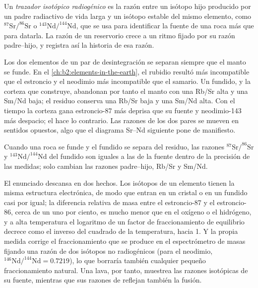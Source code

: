\begin{definition}\label{def:b2:isotope-geochemistry:tracer}
Un \emph{trazador isotópico radiogénico} es la razón
entre un isótopo hijo producido por un padre radiactivo de vida larga y un isótopo
estable del mismo elemento, como $^{87}\mathrm{Sr}/^{86}\mathrm{Sr}$ o
$^{143}\mathrm{Nd}/^{144}\mathrm{Nd}$, que se usa para identificar la fuente de una roca más que
para datarla. La razón de un reservorio crece a un ritmo fijado por su
razón padre--hijo, y registra así la historia de esa razón.
\end{definition}

Los dos elementos de un par de desintegración se separan siempre que el manto se funde. En el
\cref{ch:b2:elements-in-the-earth}, el rubidio resultó más incompatible que el
estroncio y el neodimio más incompatible que el samario. Un fundido, y la corteza
que construye, abandonan por tanto el manto con una Rb/Sr alta y una Sm/Nd baja; el
residuo conserva una Rb/Sr baja y una Sm/Nd alta. Con el tiempo la corteza gana
estroncio-87 más deprisa que su fuente y neodimio-143 más despacio; el  hace lo contrario. Las razones de los dos pares se mueven en sentidos
opuestos, algo que el diagrama Sr--Nd siguiente pone de manifiesto.

\begin{proposition}\label{prop:b2:isotope-geochemistry:melting}
Cuando una roca se funde y el fundido se separa del residuo, las razones
$^{87}\mathrm{Sr}/^{86}\mathrm{Sr}$ y $^{143}\mathrm{Nd}/^{144}\mathrm{Nd}$ del
fundido son iguales a las de la fuente dentro de la precisión de las
medidas; solo cambian las razones padre--hijo, Rb/Sr y Sm/Nd.
\end{proposition}
\admitted

\noindent El enunciado descansa en dos hechos. Los isótopos de un elemento tienen la
misma estructura electrónica, de modo que entran en un cristal o en un fundido casi por igual; la
diferencia relativa de masa entre el estroncio-87 y el estroncio-86, cerca de un uno por
ciento, es mucho menor que en el oxígeno o el hidrógeno, y a alta temperatura el
logaritmo de un factor de fraccionamiento de equilibrio decrece como el inverso del cuadrado de
la temperatura, hacia 1. Y la propia medida corrige el
fraccionamiento que se produce en el espectrómetro de masas fijando una razón de dos
isótopos no radiogénicos (para el neodimio, $^{146}\mathrm{Nd}/^{144}\mathrm{Nd} =
0.7219$), lo que borraría también cualquier pequeño fraccionamiento natural. Una lava,
por tanto, muestrea las razones isotópicas de su fuente, mientras que sus razones de
 reflejan también la fusión.


